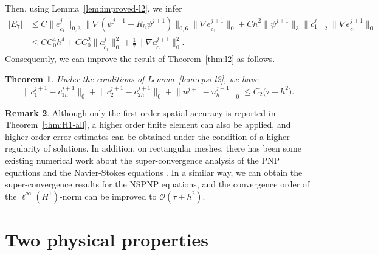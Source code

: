 \documentclass[a4paper,fleqn]{cas-sc}
\numberwithin{equation}{section}
\newtheorem{theorem}{Theorem}[section]
\theoremstyle{definition}
\newtheorem{remark}[theorem]{Remark}
\begin{document}
Then, using Lemma~\ref{lem:improved-l2}, we infer
\begin{align}
  |E_{7}|
  &\leq C\bigl\|e_{\tilde{c}_{1}}^{j}\bigr\|_{0,3}
         \bigl\|\nabla(\psi^{j+1} - R_{h}\psi^{j+1})\bigr\|_{0,6}
         \bigl\|\nabla e_{\tilde{c}_{1}}^{j+1}\bigr\|_{0}
       + Ch^{2}\bigl\|\psi^{j+1}\bigr\|_{3}\bigl\|\tilde{c}_{1}^{j}\bigr\|_{2}
         \bigl\|\nabla e_{\tilde{c}_{1}}^{j+1}\bigr\|_{0}
  \nonumber\\
  &\leq CC_{0}^{4}h^{4}
     + CC_{0}^{2}\bigl\|e_{\tilde{c}_{1}}^{j}\bigr\|_{0}^{2}
     + \frac{1}{7}\bigl\|\nabla e_{\tilde{c}_{1}}^{j+1}\bigr\|_{0}^{2}.
  \label{eq:4.92}
\end{align}
Consequently, we can improve the result of Theorem~\ref{thm:l2} as follows.

\begin{theorem}\label{thm:improved-l2}
Under the conditions of Lemma~\ref{lem:epsi-l2}, we have
\begin{equation}\label{eq:4.93}
  \bigl\|c_{1}^{j+1} - c_{1h}^{j+1}\bigr\|_{0}
  + \bigl\|c_{2}^{j+1} - c_{2h}^{j+1}\bigr\|_{0}
  + \bigl\|u^{j+1} - u_{h}^{j+1}\bigr\|_{0}
  \leq C_{2}\bigl(\tau + h^{2}\bigr).
\end{equation}
\end{theorem}

\begin{remark}\label{rem:higher-order}
Although only the first order spatial accuracy is reported in Theorem~\ref{thm:H1-all},
a higher order finite element can also be applied, and higher order error estimates can be
obtained under the condition of a higher regularity of solutions. In addition, on rectangular
meshes, there has been some existing numerical work about the super-convergence analysis of
the PNP equations and the Navier-Stokes equations \cite{Shi2019,Lin2006}. In a similar way,
we can obtain the super-convergence results for the NSPNP equations, and the convergence
order of the $\ell^{\infty}(H^{1})$-norm can be improved to $\mathcal{O}(\tau + h^{2})$.
\end{remark}



\section{Two physical properties}
\label{sec:physical}
\end{document}
